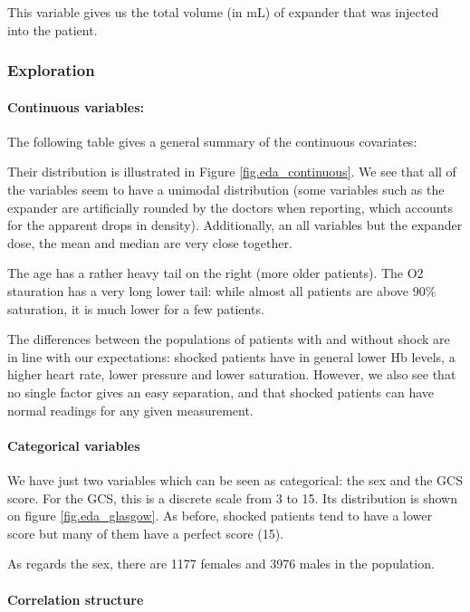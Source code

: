 This variable gives us the total volume (in mL) of expander that was injected into the patient.

			\subsubsection{Exploration}
\paragraph{Continuous variables:}
The following table gives a general summary of the continuous covariates:



Their distribution is illustrated in Figure \ref{fig.eda_continuous}. We see that all of the variables seem to have a unimodal distribution (some variables such as the expander are artificially rounded by the doctors when reporting, which accounts for the apparent drops in density). Additionally, an all variables but the expander dose, the mean and median are very close together.

The age has a rather heavy tail on the right (more older patients). The O2 stauration has a very long lower tail: while almost all patients are above 90\% saturation, it is much lower for a few patients. 

The differences between the populations of patients with and without shock are in line with our expectations: shocked patients have in general lower Hb levels, a higher heart rate, lower pressure and lower saturation. However, we also see that no single factor gives an easy separation, and that shocked patients can have normal readings for any given measurement.



\paragraph{Categorical variables}
We have just two variables which can be seen as categorical: the sex and the GCS score. For the GCS, this is a discrete scale from 3 to 15. Its distribution is shown on figure \ref{fig.eda_glasgow}. As before, shocked patients tend to have a lower score but many of them have a perfect score (15). 

As regards the sex, there are 1177 females and 3976 males in the population.



\paragraph{Correlation structure}

